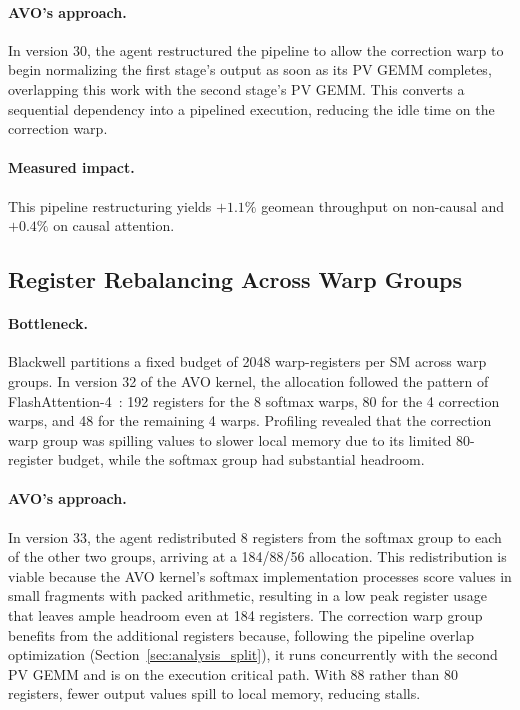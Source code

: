\paragraph{AVO's approach.}
In version 30, the agent restructured the pipeline to allow the correction warp to begin normalizing the first stage's output as soon as its PV GEMM completes, overlapping this work with the second stage's PV GEMM.
This converts a sequential dependency into a pipelined execution, reducing the idle time on the correction warp.

\paragraph{Measured impact.}
This pipeline restructuring yields $+1.1\%$ geomean throughput on non-causal and $+0.4\%$ on causal attention.

\subsection{Register Rebalancing Across Warp Groups}
\label{sec:analysis_registers}

\paragraph{Bottleneck.}
Blackwell partitions a fixed budget of 2048 warp-registers per SM across warp groups.
In version 32 of the AVO kernel, the allocation followed the pattern of FlashAttention-4~\citep{zadouri2026flashattention4}: 192 registers for the 8 softmax warps, 80 for the 4 correction warps, and 48 for the remaining 4 warps.
Profiling revealed that the correction warp group was spilling values to slower local memory due to its limited 80-register budget, while the softmax group had substantial headroom.

\paragraph{AVO's approach.}
In version 33, the agent redistributed 8 registers from the softmax group to each of the other two groups, arriving at a 184/88/56 allocation.
This redistribution is viable because the AVO kernel's softmax implementation processes score values in small fragments with packed arithmetic, resulting in a low peak register usage that leaves ample headroom even at 184 registers.
The correction warp group benefits from the additional registers because, following the pipeline overlap optimization (Section~\ref{sec:analysis_split}), it runs concurrently with the second PV GEMM and is on the execution critical path.
With 88 rather than 80 registers, fewer output values spill to local memory, reducing stalls.

